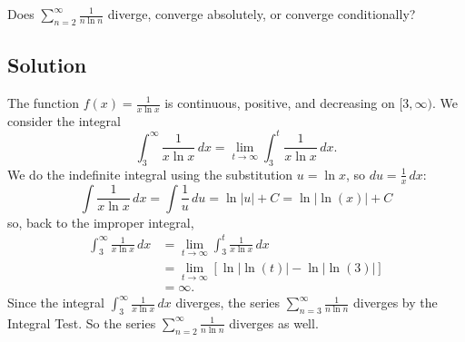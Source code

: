\documentclass{article}
\begin{document}
\noindent
Does $\displaystyle \sum_{n=2}^\infty \frac{1}{n \ln n}$
diverge, converge absolutely, or converge conditionally?


\subsection*{Solution}

The function $f(x)=\frac{1}{x \ln x}$ is continuous, positive, and decreasing on $[3,\infty)$. We consider the integral
\[ \int_3^\infty \frac{1}{x \ln x}\,dx = \lim_{t \to \infty} \int_3^t \frac{1}{x \ln x}\,dx.\]
We do the indefinite integral using the substitution $u= \ln x$, so $du = \frac1x\,dx$:
\[
\int \frac{1}{x \ln x}\,dx
= \int \frac1u\,du = \ln |u| + C = \ln | \ln (x) | + C
\]
so, back to the improper integral,
\begin{align*}
\int_3^\infty \frac1{x \ln x}\,dx 
&= \lim_{t \to \infty} \int_3^t \frac1{x\ln x}\,dx\\
&= \lim_{t \to \infty}\left[   \ln | \ln (t) |  -  \ln | \ln (3) |  \right] \\
&= \infty.
\end{align*}
Since the integral $\displaystyle  \int_3^\infty \frac{1}{x \ln x}\,dx$ diverges, the series  $\displaystyle \sum_{n=3}^\infty \frac{1}{n \ln n}$ diverges by the Integral Test. So the series $\displaystyle \sum_{n=2}^\infty \frac{1}{n \ln n}$ diverges as well.
\end{document}
